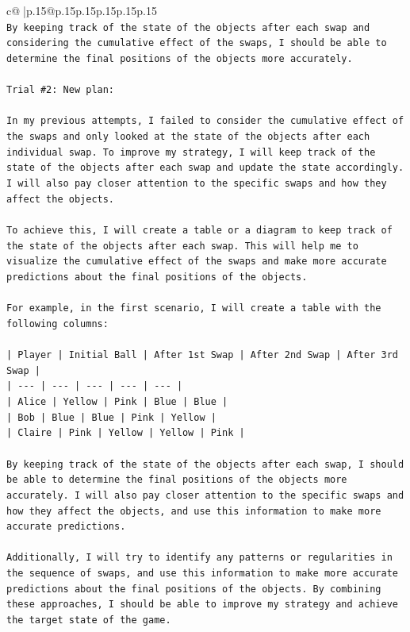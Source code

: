 \documentclass{article}
\begin{document}
{\begin{supertabular}{c@{$\;$}|p{.15\linewidth}@{}p{.15\linewidth}p{.15\linewidth}p{.15\linewidth}p{.15\linewidth}p{.15\linewidth}}
{{{\\ 
\texttt{By keeping track of the state of the objects after each swap and considering the cumulative effect of the swaps, I should be able to determine the final positions of the objects more accurately.} \\
\\ 
\texttt{Trial \#2: New plan: } \\
\\ 
\texttt{In my previous attempts, I failed to consider the cumulative effect of the swaps and only looked at the state of the objects after each individual swap. To improve my strategy, I will keep track of the state of the objects after each swap and update the state accordingly. I will also pay closer attention to the specific swaps and how they affect the objects.} \\
\\ 
\texttt{To achieve this, I will create a table or a diagram to keep track of the state of the objects after each swap. This will help me to visualize the cumulative effect of the swaps and make more accurate predictions about the final positions of the objects.} \\
\\ 
\texttt{For example, in the first scenario, I will create a table with the following columns:} \\
\\ 
\texttt{| Player | Initial Ball | After 1st Swap | After 2nd Swap | After 3rd Swap |} \\
\texttt{| {-}{-}{-} | {-}{-}{-} | {-}{-}{-} | {-}{-}{-} | {-}{-}{-} |} \\
\texttt{| Alice | Yellow | Pink | Blue | Blue |} \\
\texttt{| Bob | Blue | Blue | Pink | Yellow |} \\
\texttt{| Claire | Pink | Yellow | Yellow | Pink |} \\
\\ 
\texttt{By keeping track of the state of the objects after each swap, I should be able to determine the final positions of the objects more accurately. I will also pay closer attention to the specific swaps and how they affect the objects, and use this information to make more accurate predictions.} \\
\\ 
\texttt{Additionally, I will try to identify any patterns or regularities in the sequence of swaps, and use this information to make more accurate predictions about the final positions of the objects. By combining these approaches, I should be able to improve my strategy and achieve the target state of the game.} \\
}}}
\end{supertabular}}
\end{document}
